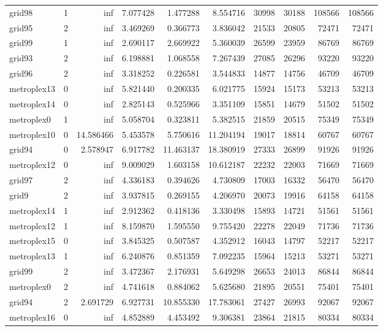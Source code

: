 \begin{longtable}{|l|r|r|r|r|r|r|r|r|r|}
grid98 & 1 & inf & 7.077428 & 1.477288 & 8.554716 & 30998 & 30188 & 108566 & 108566 \\
grid95 & 2 & inf & 3.469269 & 0.366773 & 3.836042 & 21533 & 20805 & 72471 & 72471 \\
grid99 & 1 & inf & 2.690117 & 2.669922 & 5.360039 & 26599 & 23959 & 86769 & 86769 \\
grid93 & 2 & inf & 6.198881 & 1.068558 & 7.267439 & 27085 & 26296 & 93220 & 93220 \\
grid96 & 2 & inf & 3.318252 & 0.226581 & 3.544833 & 14877 & 14756 & 46709 & 46709 \\
metroplex13 & 0 & inf & 5.821440 & 0.200335 & 6.021775 & 15924 & 15173 & 53213 & 53213 \\
metroplex14 & 0 & inf & 2.825143 & 0.525966 & 3.351109 & 15851 & 14679 & 51502 & 51502 \\
metroplex0 & 1 & inf & 5.058704 & 0.323811 & 5.382515 & 21859 & 20515 & 75349 & 75349 \\
metroplex10 & 0 & 14.586466 & 5.453578 & 5.750616 & 11.204194 & 19017 & 18814 & 60767 & 60767 \\
grid94 & 0 & 2.578947 & 6.917782 & 11.463137 & 18.380919 & 27333 & 26899 & 91926 & 91926 \\
metroplex12 & 0 & inf & 9.009029 & 1.603158 & 10.612187 & 22232 & 22003 & 71669 & 71669 \\
grid97 & 2 & inf & 4.336183 & 0.394626 & 4.730809 & 17003 & 16332 & 56470 & 56470 \\
grid9 & 2 & inf & 3.937815 & 0.269155 & 4.206970 & 20073 & 19916 & 64158 & 64158 \\
metroplex14 & 1 & inf & 2.912362 & 0.418136 & 3.330498 & 15893 & 14721 & 51561 & 51561 \\
metroplex12 & 1 & inf & 8.159870 & 1.595550 & 9.755420 & 22278 & 22049 & 71736 & 71736 \\
metroplex15 & 0 & inf & 3.845325 & 0.507587 & 4.352912 & 16043 & 14797 & 52217 & 52217 \\
metroplex13 & 1 & inf & 6.240876 & 0.851359 & 7.092235 & 15964 & 15213 & 53271 & 53271 \\
grid99 & 2 & inf & 3.472367 & 2.176931 & 5.649298 & 26653 & 24013 & 86844 & 86844 \\
metroplex0 & 2 & inf & 4.741618 & 0.884062 & 5.625680 & 21895 & 20551 & 75401 & 75401 \\
grid94 & 2 & 2.691729 & 6.927731 & 10.855330 & 17.783061 & 27427 & 26993 & 92067 & 92067 \\
metroplex16 & 0 & inf & 4.852889 & 4.453492 & 9.306381 & 23864 & 21815 & 80334 & 80334 \\

\end{longtable}
